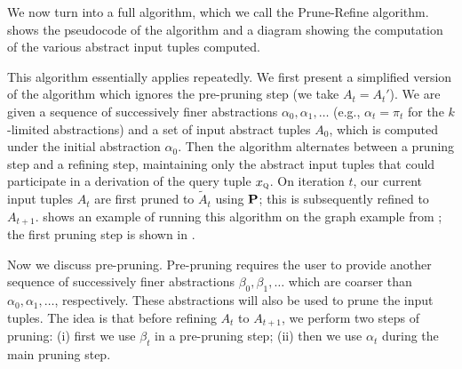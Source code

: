 We now turn  into a full algorithm, which we call the
Prune-Refine algorithm.   shows the pseudocode
of the algorithm and a diagram showing the computation of the various abstract
input tuples computed.

This algorithm essentially applies  repeatedly.
We first present a simplified version of the algorithm which
ignores the pre-pruning step (we take $A_t = A_t'$).
We are given a sequence of successively finer abstractions $\alpha_0, \alpha_1, \dots$
(e.g., $\alpha_t = \pi_t$ for the $k$-limited abstractions)
and a set of input abstract tuples $A_0$, which is computed
under the initial abstraction $\alpha_0$.  Then the algorithm alternates between a pruning step
and a refining step, maintaining only the abstract input tuples
that could participate in a derivation of the query tuple $x_\text{\sc q}$.
On iteration $t$, our current input tuples $A_t$ are first pruned to $\tilde A_t$ using $\mathbf{P}$;
this is subsequently refined to $A_{t+1}$.
 shows an example of running this algorithm on the graph
example from ; the first pruning step is shown in
.


Now we discuss pre-pruning.  Pre-pruning requires the user to provide
another sequence of successively finer abstractions $\beta_0, \beta_1, \dots$
which are coarser than $\alpha_0, \alpha_1, \dots$, respectively.
These abstractions will also be used to prune the input tuples.
The idea is that before refining $A_t$ to $A_{t+1}$,
we perform two steps of pruning:
(i) first we use $\beta_t$ in a pre-pruning step;
(ii) then we use $\alpha_t$ during the main pruning step.

